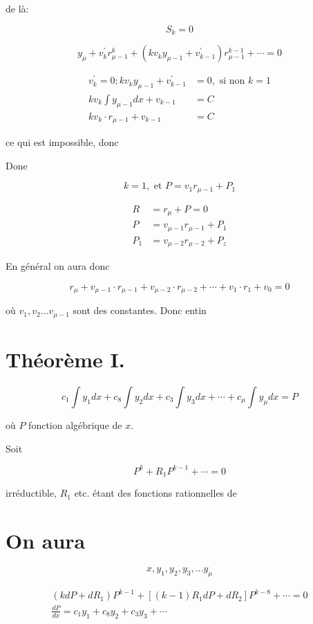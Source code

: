 \documentclass{article}
\begin{document}
de là:

\[
S_{k}=0
\]

\[
y_{\mu}+v_{k}^{\prime} r_{\mu-1}^{k}+\left(k v_{k} y_{\mu-1}+v_{k-1}^{\prime}\right) r_{\mu-1}^{k-1}+\cdots=0
\]

\[
\begin{aligned}
v_{k}^{\prime}=0 ; k v_{k} y_{\mu-1}+v_{k-1}^{\prime} & =0, \text { si non } k=1 \\
k v_{k} \int y_{\mu-1} d x+v_{k-1} & =C \\
k v_{k} \cdot r_{\mu-1}+v_{k-1} & =C
\end{aligned}
\]

ce qui est impossible, donc

Done

\[
k=1, \text { et } P=v_{1} r_{\mu-1}+P_{1}
\]

\[
\begin{aligned}
R & =r_{\mu}+P=0 \\
P & =v_{\mu-1} r_{\mu-1}+P_{1} \\
P_{1} & =v_{\mu-2} r_{\mu-2}+P_{z}
\end{aligned}
\]

En général on aura donc

\[
r_{\mu}+v_{\mu-1} \cdot r_{\mu-1}+v_{\mu-2} \cdot r_{\mu-2}+\cdots+v_{1} \cdot r_{1}+v_{0}=0
\]

où \(v_{1}, v_{2} \ldots v_{\mu-1}\) sont des constantes. Donc entin

\section*{Théorème I.}

\[
c_{1} \int y_{1} d x+c_{8} \int y_{2} d x+c_{3} \int y_{3} d x+\cdots+c_{\mu} \int y_{\mu} d x=P
\]

où \(P\) fonction algébrique de \(x\).

Soit

\[
P^{k}+R_{1} P^{k-1}+\cdots=0
\]

irréductible, \(R_{1}\) etc. étant des fonctions rationnelles de

\section*{On aura}

\[
x, y_{1}, y_{2}, y_{3}, \ldots y_{\mu}
\]

\[
\begin{gathered}
\left(k d P+d R_{1}\right) P^{k-1}+\left[(k-1) R_{1} d P+d R_{2}\right] P^{k-8}+\cdots=0 \\
\frac{d P}{d x}=c_{1} y_{1}+c_{8} y_{2}+c_{3} y_{3}+\cdots
\end{gathered}
\]
\end{document}
